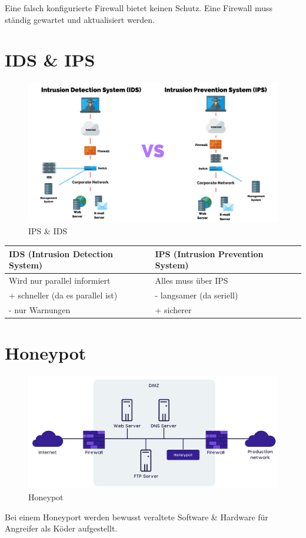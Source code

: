 Eine falsch konfigurierte Firewall bietet keinen Schutz. Eine Firewall muss ständig gewartet und aktualisiert werden.

\section{IDS \& IPS}
\begin{figure}[H]
	\centering
	\includegraphics[width=0.8\linewidth]{figures/ids_ips.png}
	\caption{IPS \& IDS}
\end{figure}

\begin{tabular}{ | p{} | p{} |} \hline
	\textbf{IDS (Intrusion Detection System)} & \textbf{IPS (Intrusion Prevention System)} \\ \hline
	Wird nur parallel informiert & Alles muss über IPS \\
	+ schneller (da es parallel ist) & - langsamer (da seriell) \\
	- nur Warnungen & + sicherer \\
	\hline
\end{tabular} 

\section{Honeypot}
\begin{figure}[H]
	\centering
	\includegraphics[width=0.8\linewidth]{figures/honeypot.png}
	\caption{Honeypot}
\end{figure}
Bei einem Honeyport werden bewusst veraltete Software \& Hardware für Angreifer als Köder aufgestellt. 

